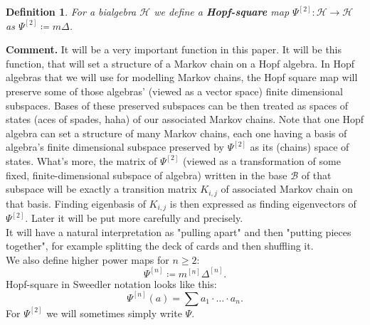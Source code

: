 \documentclass[a4paper, 12pt]{article}
\newtheorem{definition}{Definition}
\begin{document}
\begin{definition}
For a bialgebra $\mathcal{H}$ we define a \textbf{Hopf-square} map
$\Psi^{[2]} : \mathcal{H} \to \mathcal{H}$ as $\Psi^{[2]} \coloneqq m\Delta$.
\end{definition}
\textbf{Comment. } It will be a very important function in this paper. It will be this function, that will
set a structure
of a Markov chain on a Hopf algebra. In Hopf algebras that we will
use for modelling Markov chains, the Hopf square map will preserve some of those algebras'
(viewed as a vector space) finite dimensional subspaces. Bases of these preserved
subspaces can be then treated as spaces of states (aces of spades, haha)
of our associated Markov chains. Note that one Hopf algebra can set a structure of many Markov chains,
each one having a basis of algebra's finite dimensional subspace preserved by $\Psi^{[2]}$ as its (chains)
space of states.
What's more, the matrix of $\Psi^{[2]}$ (viewed as a transformation of some fixed, finite-dimensional
subspace of algebra)
written in the base $\mathcal{B}$ of that subspace will be exactly a transition matrix
$K_{i,j}$ of associated Markov chain on that basis. Finding eigenbasis of $K_{i,j}$ is then expressed as
finding eigenvectors of $\Psi^{[2]}$. Later it will be put more carefully and precisely. \\
It will have a natural interpretation as "pulling apart" and then "putting pieces together", for
example splitting the deck of cards and then shuffling it. \\[4pt]
We also define higher power maps for $n \geq 2$:
\begin{equation*}
\Psi^{[n]} \coloneqq m^{[n]}\Delta^{[n]}.
\end{equation*}
Hopf-square in Sweedler notation looks like this:
\begin{equation*}
\Psi^{[n]}(a) = \sum a_1 \cdot \ldots \cdot a_n.
\end{equation*}
For $\Psi^{[2]}$ we will sometimes simply write $\Psi$.
\end{document}

